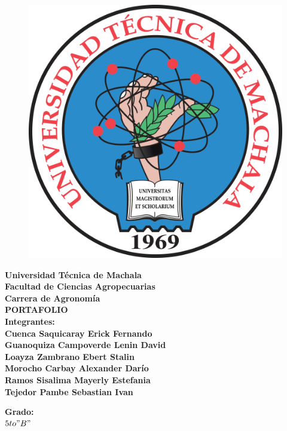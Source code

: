 \documentclass[
]{article}
\author{}
\date{\vspace{-2.5em}}
\begin{document}
\begin{tcolorbox}[colback=amarillo!30!white, sharp corners=uphill, colframe = amarillo,arc = 25mm]
\centering 
\begin{titlepage}
\begin{center}
\captionsetup[figure]{labelformat=empty}
\begin{figure}[H]
        \centering
        \includegraphics[width=0.1\linewidth]{LOGO_OUT.png}
        \caption{}
        \label{fig:Utmach}
    \end{figure}
        {\Large\textbf{Universidad Técnica de Machala}}\\\vspace{4mm}
    {\Large\textbf{Facultad de Ciencias Agropecuarias}}
    \\\vspace{5mm}
    {\Large\textbf{Carrera de Agronomía}}\\\vspace{1cm}
    \textcolor{coolblack}{\LARGE\textbf{PORTAFOLIO %
     }}
    \\\vspace{1cm}
    {\large\textbf{Integrantes:}}\\\vspace{1cm}
    \textcolor{coolblack}{\LARGE\textbf{    Cuenca Saquicaray Erick Fernando }}\\\vspace{0.5cm}
        \textcolor{coolblack}{\LARGE\textbf{ Guanoquiza Campoverde Lenin David}}\\\vspace{0.5cm}
    \textcolor{coolblack}{\LARGE\textbf{Loayza Zambrano Ebert Stalin }}\\\vspace{0.5cm}
        \textcolor{coolblack}{\LARGE\textbf{Morocho Carbay Alexander Darío }}\\\vspace{0.5cm}
    \textcolor{coolblack}{\LARGE\textbf{Ramos Sisalima Mayerly Estefania }}\\\vspace{0.5cm}
    \textcolor{coolblack}{\LARGE\textbf{Tejedor Pambe Sebastian Ivan }}\\\vspace{0.5cm}

    {\large\textbf{Grado:}}\\\vspace{1cm}
    \textcolor{coolblack}{\LARGE\textbf{$ 5to "B"  $  }}\\\vspace{1cm}
    

\end{center}
\end{titlepage}
\end{tcolorbox}
\end{document}
